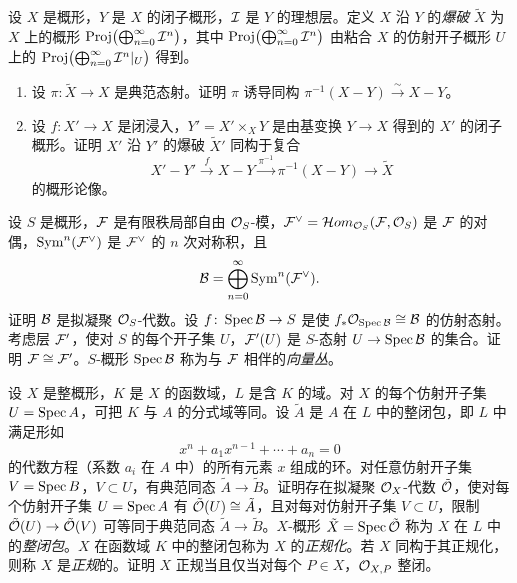 \begin{exercises}
\item \label{ex:1.4.4} 设 $X$ 是概形，$Y$ 是 $X$ 的闭子概形，$\mathcal{I}$ 是 $Y$ 的理想层。定义 $X$ 沿 $Y$ 的\emph{爆破} $\tilde X$ 为 $X$ 上的概形 $\operatorname{Proj}\bigl(\bigoplus_{n=0}^\infty\mathcal{I}^n\bigr)$，其中 $\operatorname{Proj}\bigl(\bigoplus_{n=0}^\infty\mathcal{I}^n\bigr)$ 由粘合 $X$ 的仿射开子概形 $U$ 上的 $\operatorname{Proj}\bigl(\bigoplus_{n=0}^\infty\mathcal{I}^n|_U\bigr)$ 得到。
\begin{enumerate}[label=(\arabic*),leftmargin=2.2em]
  \item 设 $\pi\colon\tilde X\to X$ 是典范态射。证明 $\pi$ 诱导同构 $\pi^{-1}(X-Y)\xrightarrow{\sim}X-Y$。
  \item 设 $f\colon X'\to X$ 是闭浸入，$Y'=X'\times_XY$ 是由基变换 $Y\to X$ 得到的 $X'$ 的闭子概形。证明 $X'$ 沿 $Y'$ 的爆破 $\tilde X'$ 同构于复合
  \[
  X'-Y'\xrightarrow{f}X-Y\xrightarrow{\pi^{-1}}\pi^{-1}(X-Y)\to\tilde X
  \]
  的概形论像。
\end{enumerate}

\item \label{ex:1.4.5} 设 $S$ 是概形，$\mathcal{F}$ 是有限秩局部自由 $\mathcal{O}_S$-模，$\mathcal{F}^\vee=\mathcal{H}om_{\mathcal{O}_S}(\mathcal{F},\mathcal{O}_S)$ 是 $\mathcal{F}$ 的对偶，$\operatorname{Sym}^n(\mathcal{F}^\vee)$ 是 $\mathcal{F}^\vee$ 的 $n$ 次对称积，且
\[
\mathcal{B}=\bigoplus_{n=0}^\infty\operatorname{Sym}^n(\mathcal{F}^\vee).
\]
证明 $\mathcal{B}$ 是拟凝聚 $\mathcal{O}_S$-代数。设 $f\colon\operatorname{Spec}\mathcal{B}\to S$ 是使 $f_*\mathcal{O}_{\operatorname{Spec}\mathcal{B}}\cong\mathcal{B}$ 的仿射态射。考虑层 $\mathcal{F}'$，使对 $S$ 的每个开子集 $U$，$\mathcal{F}'(U)$ 是 $S$-态射 $U\to\operatorname{Spec}\mathcal{B}$ 的集合。证明 $\mathcal{F}\cong\mathcal{F}'$。$S$-概形 $\operatorname{Spec}\mathcal{B}$ 称为与 $\mathcal{F}$ 相伴的\emph{向量丛}。

\item \label{ex:1.4.6} 设 $X$ 是整概形，$K$ 是 $X$ 的函数域，$L$ 是含 $K$ 的域。对 $X$ 的每个仿射开子集 $U=\operatorname{Spec} A$，可把 $K$ 与 $A$ 的分式域等同。设 $\tilde A$ 是 $A$ 在 $L$ 中的整闭包，即 $L$ 中满足形如
\[
x^n+a_1x^{n-1}+\cdots+a_n=0
\]
的代数方程（系数 $a_i$ 在 $A$ 中）的所有元素 $x$ 组成的环。对任意仿射开子集 $V=\operatorname{Spec} B$，$V\subset U$，有典范同态 $\tilde A\to\tilde B$。证明存在拟凝聚 $\mathcal{O}_X$-代数 $\tilde{\mathcal{O}}$，使对每个仿射开子集 $U=\operatorname{Spec} A$ 有 $\tilde{\mathcal{O}}(U)\cong\tilde A$，且对每对仿射开子集 $V\subset U$，限制 $\tilde{\mathcal{O}}(U)\to\tilde{\mathcal{O}}(V)$ 可等同于典范同态 $\tilde A\to\tilde B$。$X$-概形 $\tilde X=\operatorname{Spec}\tilde{\mathcal{O}}$ 称为 $X$ 在 $L$ 中的\emph{整闭包}。$X$ 在函数域 $K$ 中的整闭包称为 $X$ 的\emph{正规化}。若 $X$ 同构于其正规化，则称 $X$ 是\emph{正规}的。证明 $X$ 正规当且仅当对每个 $P\in X$，$\mathcal{O}_{X,P}$ 整闭。
\end{exercises}
